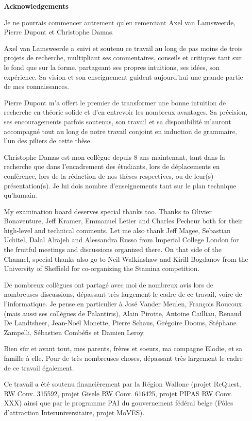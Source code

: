 \begin{center}
\textbf{\large Acknowledgements}
\end{center}

Je ne pourrais commencer autrement qu'en remerciant Axel van Lamsweerde, Pierre 
Dupont et Christophe Damas.

Axel van Lamsweerde a suivi et soutenu ce travail au long de pas moins de 
trois projets de recherche, multipliant ses commentaires, conseils et critiques 
tant sur le fond que sur la forme, partageant ses propres intuitions, ses id\'ees,
son exp\'erience. Sa vision et son enseignement guident aujourd'hui une 
grande partie de mes connaissances.

Pierre Dupont m'a offert le premier de transformer une bonne intuition de 
recherche en th\'eorie solide et d'en entrevoir les nombreux avantages. Sa 
pr\'ecision, ses encouragements parfois soutenus, son travail et sa 
disponibilit\'e m'auront accompagn\'e tout au long de notre travail conjoint en 
induction de grammaire, l'un des piliers de cette th\`ese.

Christophe Damas est mon coll\`egue depuis 8 ans maintenant, tant dans la 
recherche que dans l'encadrement des \'etudiants, lors de d\'eplacements en 
conf\'erence, lors de la r\'edaction de nos th\`eses respectives, ou de leur(s) 
pr\'esentation(s). Je lui dois nombre d'enseignements tant sur le plan technique 
qu'humain.

My examination board deserves special thanks too. Thanks to Olivier Bonaventure, 
Jeff Kramer, Emmanuel Letier and Charles Pecheur both for their high-level and 
technical comments. Let me also thank Jeff Magee, Sebastian Uchitel, Dalal 
Alrajeh and Alessandra Russo from Imperial College London for the fruitful 
meetings and discussions organized there. On that side of the Channel, special 
thanks also go to Neil Walkinshaw and Kirill Bogdanov from the University of 
Sheffield for co-organizing the Stamina competition.

De nombreux coll\`egues ont partag\'e avec moi de nombreux avis lors de 
nombreuses discussions, d\'epassant tr\`es largement le cadre de ce travail, 
voire de l'informatique. Je pense en particulier \`a Jos\'e Vander Meulen, 
Fran\c{c}ois Roucoux (mais aussi ses coll\`egues de Palantiris), Alain Pirotte,
Antoine Cailliau, Renaud De Landtsheer, Jean-No\"el Monette, Pierre Schaus, 
Gr\'egoire Dooms, St\'ephane Zampelli, S\'ebastien Comb\'efis et Damien Leroy.

Bien s\^ur et avant tout, mes parents, fr\`eres et soeurs, ma compagne Elodie, 
et sa famille \`a elle. Pour de tr\`es nombreuses choses, d\'epassant tr\`es 
largement le cadre de ce travail \'egalement.

Ce travail a \'et\'e soutenu financi\`erement par la R\'egion Wallone (projet 
ReQuest, RW Conv. 315592, projet Gisele RW Conv. 616425, projet PIPAS RW Conv. 
XXX) ainsi que par le programme PAI du gouvernement f\'ed\'eral belge (P\^oles 
d'attraction Interuniversitaire, projet MoVES).

